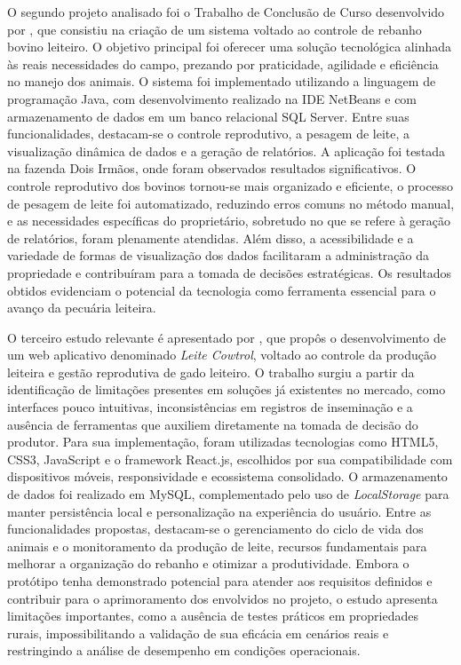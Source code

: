 O segundo projeto analisado foi o Trabalho de Conclusão de Curso desenvolvido por \cite{Pamella2017}, que consistiu na criação de um sistema voltado ao controle de rebanho bovino leiteiro. O objetivo principal foi oferecer uma solução tecnológica alinhada às reais necessidades do campo, prezando por praticidade, agilidade e eficiência no manejo dos animais. O sistema foi implementado utilizando a linguagem de programação Java, com desenvolvimento realizado na IDE NetBeans e com armazenamento de dados em um banco relacional SQL Server. Entre suas funcionalidades, destacam-se o controle reprodutivo, a pesagem de leite, a visualização dinâmica de dados e a geração de relatórios. A aplicação foi testada na fazenda Dois Irmãos, onde foram observados resultados significativos. O controle reprodutivo dos bovinos tornou-se mais organizado e eficiente, o processo de pesagem de leite foi automatizado, reduzindo erros comuns no método manual, e as necessidades específicas do proprietário, sobretudo no que se refere à geração de relatórios, foram plenamente atendidas. Além disso, a acessibilidade e a variedade de formas de visualização dos dados facilitaram a administração da propriedade e contribuíram para a tomada de decisões estratégicas. Os resultados obtidos evidenciam o potencial da tecnologia como ferramenta essencial para o avanço da pecuária leiteira.

O terceiro estudo relevante é apresentado por \cite{LIMA2023}, que propôs o desenvolvimento de um web aplicativo denominado \textit{Leite Cowtrol}, voltado ao controle da produção leiteira e gestão reprodutiva de gado leiteiro. O trabalho surgiu a partir da identificação de limitações presentes em soluções já existentes no mercado, como interfaces pouco intuitivas, inconsistências em registros de inseminação e a ausência de ferramentas que auxiliem diretamente na tomada de decisão do produtor. Para sua implementação, foram utilizadas tecnologias como HTML5, CSS3, JavaScript e o framework React.js, escolhidos por sua compatibilidade com dispositivos móveis, responsividade e ecossistema consolidado. O armazenamento de dados foi realizado em MySQL, complementado pelo uso de \textit{LocalStorage} para manter persistência local e personalização na experiência do usuário. Entre as funcionalidades propostas, destacam-se o gerenciamento do ciclo de vida dos animais e o monitoramento da produção de leite, recursos fundamentais para melhorar a organização do rebanho e otimizar a produtividade. Embora o protótipo tenha demonstrado potencial para atender aos requisitos definidos e contribuir para o aprimoramento dos envolvidos no projeto, o estudo apresenta limitações importantes, como a ausência de testes práticos em propriedades rurais, impossibilitando a validação de sua eficácia em cenários reais e restringindo a análise de desempenho em condições operacionais.

